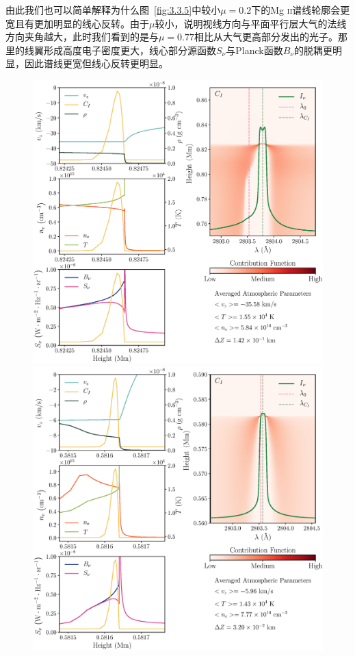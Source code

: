 由此我们也可以简单解释为什么图~\ref{fig:3.3.5}中较小$\mu = 0.2$下的Mg \textsc{ii}谱线轮廓会更宽且有更加明显的线心反转。由于$\mu$较小，说明视线方向与平面平行层大气的法线方向夹角越大，此时我们看到的是与$\mu=0.77$相比从大气更高部分发出的光子。那里的线翼形成高度电子密度更大，线心部分源函数$S_\nu$与Planck函数$B_\nu$的脱耦更明显，因此谱线更宽但线心反转更明显。


\begin{figure}[htbp]
	\begin{minipage}[t]{0.5\linewidth}
	\centering
	\includegraphics[width=\linewidth]{figs/ctb_5F11_88_lc}
	\end{minipage}%
	\hfill
	\begin{minipage}[t]{0.5\linewidth}
	\centering
	\includegraphics[width=\linewidth]{figs/ctb_5F11_250_lc}

\end{minipage}
\end{figure}
